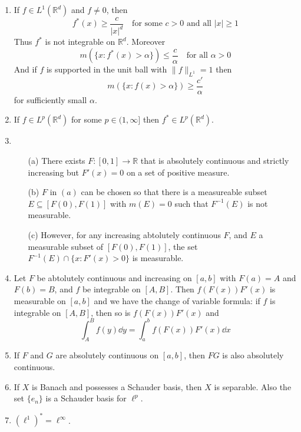 \documentclass{article}
\theoremstyle{definition}
\newcommand{\RR}{\mathbb R}
\begin{document}
\begin{enumerate}
	\item If $f \in L^1(\RR^d)$ and $f \neq 0$, then
		\[
			f^*(x) \geq \frac{c}{|x|^d} \quad \text{for some }c > 0 \text{ and all }|x| \geq 1
		\]
		Thus $f^*$ is not integrable on $\RR^d$. 
		Moreover
		\[
			m(\{x: f^*(x) > \alpha\}) \leq \frac{c}{\alpha} \quad \text{for all }\alpha > 0
		\]
		And if $f$ is supported in the unit ball with $\|f\|_{L^1} = 1$ then
		\[
			m(\{x: f(x) > \alpha\}) \geq \frac{c'}{\alpha}
		\]
		for sufficiently small $\alpha$.

	\item If $f \in L^p(\RR^d)$ for some $p \in (1, \infty]$ then $f^* \in L^p(\RR^d)$.	

	\item
		\begin{enumerate}
			\item[(a)] There exists $F:[0, 1] \to \RR$ that is absolutely continuous and strictly increasing but $F'(x) = 0$ on a set of positive measure.

			\item[(b)] $F$ in $(a)$ can be chosen so that there is a measureable subset $E \subseteq [F(0), F(1)]$ with $m(E) = 0$ such that $F^{-1}(E)$ is not measurable.

			\item[(c)] However, for any increasing abtolutely continuous $F$, and $E$ a measurable subset of $[F(0), F(1)]$, the set $F^{-1}(E) \cap \{x: F'(x) > 0\}$ is measurable.
		\end{enumerate}

	\item Let $F$ be abtolutely continuous and increasing on $[a, b]$ with $F(a) = A$ and $F(b) = B$, and $f$ be integrable on $[A, B]$.
		Then $f(F(x)) F'(x)$ is measurable on $[a, b]$ and we have the change of variable formula: if $f$ is integrable on $[A, B]$, then so is $f(F(x)) F'(x)$ and
		\[
			\int_A^B f(y) \dd{y} = \int_a^b f(F(x)) F'(x) \dd{x}
		\]

	\item If $F$ and $G$ are absolutely continuous on $[a, b]$, then $FG$ is also absolutely continuous.

	\item If $X$ is Banach and possesses a Schauder basis, then $X$ is separable.
		Also the set $\{e_n\}$ is a Schauder basis for $\ell^p$.

	\item $(\ell^1)^* = \ell^\infty$.


\end{enumerate}
\end{document}

